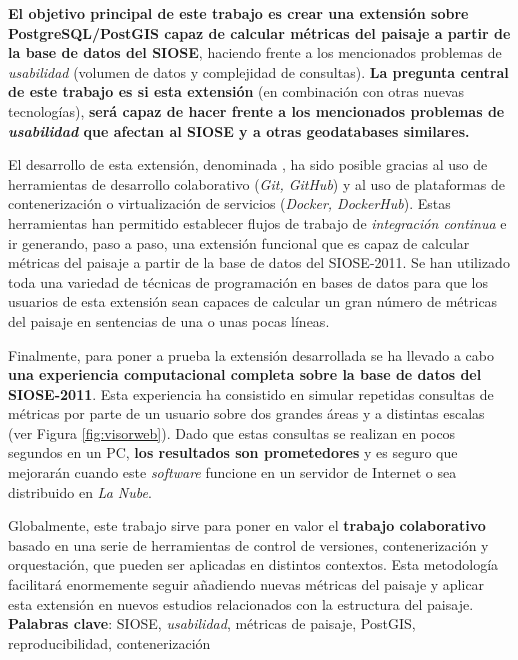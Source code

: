\begin{resumen}
\textbf{El objetivo principal de este trabajo es crear una extensión sobre PostgreSQL/PostGIS capaz de calcular métricas del paisaje a partir de la base de datos del SIOSE}, haciendo frente a los mencionados problemas de \textit{usabilidad} (volumen de datos y complejidad de consultas). \textbf{La pregunta central de este trabajo es si esta extensión} (en combinación con otras nuevas tecnologías), \textbf{será capaz de hacer frente a los mencionados problemas de \textit{usabilidad} que afectan al SIOSE y a otras geodatabases similares.}

El desarrollo de esta extensión, denominada \pgland{}, ha sido posible gracias al uso de herramientas de desarrollo colaborativo (\textit{Git, GitHub}) y al uso de plataformas de contenerización o virtualización de servicios (\textit{Docker, DockerHub}). Estas herramientas han permitido establecer flujos de trabajo de \textit{integración continua} e ir generando, paso a paso, una extensión funcional que es capaz de calcular métricas del paisaje a partir de la base de datos del SIOSE-2011. Se han utilizado toda una variedad de técnicas de programación en bases de datos para que los usuarios de esta extensión sean capaces de calcular un gran número de métricas del paisaje en sentencias de una o unas pocas líneas.

Finalmente, para poner a prueba la extensión desarrollada se ha llevado a cabo \textbf{una experiencia computacional completa sobre la base de datos del SIOSE-2011}. Esta experiencia ha consistido en simular repetidas consultas de métricas por parte de un usuario sobre dos grandes áreas y a distintas escalas (ver Figura \ref{fig:visorweb}). Dado que estas consultas se realizan en pocos segundos en un PC, \textbf{los resultados son prometedores} y es seguro que mejorarán cuando este \textit{software} funcione en un servidor de Internet o sea distribuido en \textit{La Nube}.

Globalmente, este trabajo sirve para poner en valor el \textbf{trabajo colaborativo} basado en una serie de herramientas de control de versiones, contenerización y orquestación, que pueden ser aplicadas en distintos contextos. Esta metodología facilitará enormemente seguir añadiendo nuevas métricas del paisaje y aplicar esta extensión en nuevos estudios relacionados con la estructura del paisaje.\\


\textbf{Palabras clave}: SIOSE, \textit{usabilidad}, métricas de paisaje, PostGIS, reproducibilidad, contenerización


\end{resumen}
